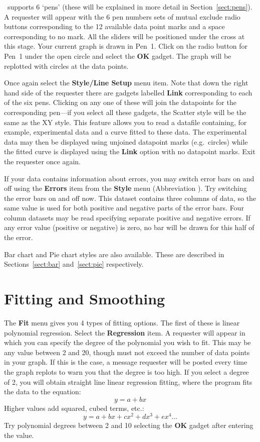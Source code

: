 \amplot\ supports 6 `pens' (these will be explained in more detail in 
Section~\ref{sect:pens}).
A requester will appear with the 6 pen numbers sets of mutual exclude radio buttons
corresponding to the 12 available data point marks and a space corresponding to no 
mark. All the sliders will be positioned under the cross at this stage. Your 
current graph is drawn in Pen~1. Click on the radio button for Pen~1
under the open circle and select the {\bf OK} gadget. The graph will be 
replotted with circles at the data points.

Once again select the {\bf Style/Line Setup} menu item.
Note that down the right hand side of the requester there are gadgets labelled 
{\bf Link} corresponding to each of the six pens. 
Clicking on any one of these will join the datapoints for the 
corresponding pen---if you select all these gadgets, the Scatter style will be 
the same as the XY style. This feature allows you to read a datafile containing, 
for example, experimental data and a curve fitted to these data. The experimental 
data may then be displayed using unjoined datapoint marks (e.g.\ circles) while 
the fitted curve is displayed using the {\bf Link} option with no datapoint marks.
Exit the requester once again.

If your data contains information about errors,
you may switch error bars on and off using the {\bf Errors} item from the 
{\bf Style} menu (Abbreviation ).
Try switching the error bars on and off now. This dataset contains three columns
of data, so the same value is used for both positive and negative parts of the
error bars. Four column datasets may be read specifying separate positive and
negative errors. If any error value (positive or negative) is zero, no bar
will be drawn for this half of the error.

Bar chart and Pie chart styles are also available. These are described in 
Sections~\ref{sect:bar} and~\ref{sect:pie} respectively.






\section{Fitting and Smoothing}
The {\bf Fit} menu gives you 4 types of fitting options. The first of these is 
linear polynomial regression. Select the {\bf Regression} item.
A requester 
will appear in which you can specify the degree of the polynomial you wish to 
fit. This may be any value between 2 and 20, though must not exceed the number of 
data points in your graph. If this is the case, a message requester will be posted
every time the graph replots to warn you that the degree is too high.
If you select a degree of 2, you will obtain straight line linear regression fitting, 
where the program fits the data to the equation:
$$y=a+bx$$
Higher values add squared, cubed terms, etc.:
$$y=a+bx+cx^2+dx^3+ex^4\ldots$$
Try polynomial degrees between 2 and 10 selecting the {\bf OK} gadget after entering 
the value.

